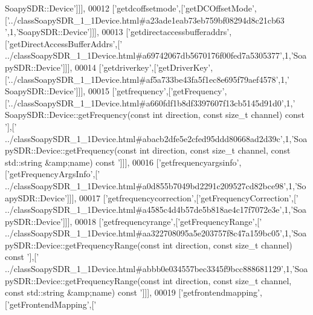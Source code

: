 \begin{DoxyCode}
{      SoapySDR::Device'}]]],
00012   [\textcolor{stringliteral}{'getdcoffsetmode'},[\textcolor{stringliteral}{'getDCOffsetMode'},[\textcolor{stringliteral}{'../classSoapySDR\_1\_1Device.html#a23ade1eab73eb759bf08294d8c21cb63
      '},1,\textcolor{stringliteral}{'SoapySDR::Device'}]]],
00013   [\textcolor{stringliteral}{'getdirectaccessbufferaddrs'},[\textcolor{stringliteral}{'getDirectAccessBufferAddrs'},[\textcolor{stringliteral}{'
      ../classSoapySDR\_1\_1Device.html#a69742067db5670176f00fed7a5305377'},1,\textcolor{stringliteral}{'SoapySDR::Device'}]]],
00014   [\textcolor{stringliteral}{'getdriverkey'},[\textcolor{stringliteral}{'getDriverKey'},[\textcolor{stringliteral}{'../classSoapySDR\_1\_1Device.html#af5a733be43fa5f1ec8e695f79aef4578'},1,\textcolor{stringliteral}{'
      SoapySDR::Device'}]]],
00015   [\textcolor{stringliteral}{'getfrequency'},[\textcolor{stringliteral}{'getFrequency'},[\textcolor{stringliteral}{'../classSoapySDR\_1\_1Device.html#a660fdf1b8df3397607f13cb5145d91d0'},1,\textcolor{stringliteral}{'
      SoapySDR::Device::getFrequency(const int direction, const size\_t channel) const '}],[\textcolor{stringliteral}{'
      ../classSoapySDR\_1\_1Device.html#abacb2dfe5e2cfed95ddd80668ad2d39c'},1,\textcolor{stringliteral}{'SoapySDR::Device::getFrequency(const int direction, const
       size\_t channel, const std::string &amp;name) const '}]]],
00016   [\textcolor{stringliteral}{'getfrequencyargsinfo'},[\textcolor{stringliteral}{'getFrequencyArgsInfo'},[\textcolor{stringliteral}{'
      ../classSoapySDR\_1\_1Device.html#a0d855b7049bd2291c209527cd82bce98'},1,\textcolor{stringliteral}{'SoapySDR::Device'}]]],
00017   [\textcolor{stringliteral}{'getfrequencycorrection'},[\textcolor{stringliteral}{'getFrequencyCorrection'},[\textcolor{stringliteral}{'
      ../classSoapySDR\_1\_1Device.html#a4585c4d4b57de5b818ae4c17f7072e3e'},1,\textcolor{stringliteral}{'SoapySDR::Device'}]]],
00018   [\textcolor{stringliteral}{'getfrequencyrange'},[\textcolor{stringliteral}{'getFrequencyRange'},[\textcolor{stringliteral}{'
      ../classSoapySDR\_1\_1Device.html#aa322708095a5e203757f8c47a159bc05'},1,\textcolor{stringliteral}{'SoapySDR::Device::getFrequencyRange(const int direction, const size\_t channel) const '}],[\textcolor{stringliteral}{'
      ../classSoapySDR\_1\_1Device.html#abbb0e034557bec3345f9bcc888681129'},1,\textcolor{stringliteral}{'SoapySDR::Device::getFrequencyRange(const int
       direction, const size\_t channel, const std::string &amp;name) const '}]]],
00019   [\textcolor{stringliteral}{'getfrontendmapping'},[\textcolor{stringliteral}{'getFrontendMapping'},[\textcolor{stringliteral}{'
}
\end{DoxyCode}
